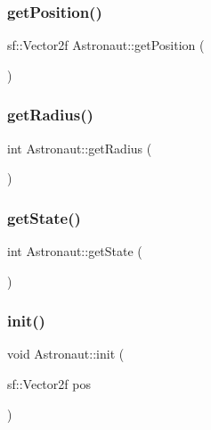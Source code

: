\mbox{\label{class_astronaut_a3738ff50527c44f089b110ecdb0be2f3}} 
\subsubsection{\texorpdfstring{get\+Position()}{getPosition()}}
{\footnotesize\ttfamily sf\+::\+Vector2f Astronaut\+::get\+Position (\begin{DoxyParamCaption}{ }\end{DoxyParamCaption})}

\mbox{\label{class_astronaut_afcf013c7b009a8ef65ab84613eba4000}} 
\subsubsection{\texorpdfstring{get\+Radius()}{getRadius()}}
{\footnotesize\ttfamily int Astronaut\+::get\+Radius (\begin{DoxyParamCaption}{ }\end{DoxyParamCaption})}

\mbox{\label{class_astronaut_a6396ab5b07039062ab97666d36bb781a}} 
\subsubsection{\texorpdfstring{get\+State()}{getState()}}
{\footnotesize\ttfamily int Astronaut\+::get\+State (\begin{DoxyParamCaption}{ }\end{DoxyParamCaption})}

\mbox{\label{class_astronaut_a1f21de93b38b191d9641b8b23bcbbacb}} 
\subsubsection{\texorpdfstring{init()}{init()}}
{\footnotesize\ttfamily void Astronaut\+::init (\begin{DoxyParamCaption}\item[{sf\+::\+Vector2f}]{pos }\end{DoxyParamCaption})}

